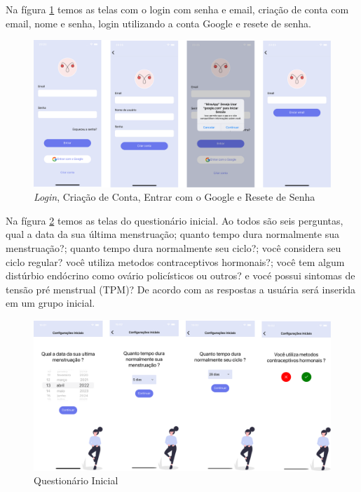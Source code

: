 Na fígura \ref{fig19} temos as telas com o login com senha e email, criação de conta com email, nome e senha, 
login utilizando a conta Google e resete de senha.

\begin{figure}[ht]
    \centering
    \includegraphics[keepaspectratio=true,scale=0.08]{figuras/aplicativo1.png}
    \caption{\emph{Login}, Criação de Conta, Entrar com o Google e Resete de Senha }
        \label{fig19}
\end{figure}


Na fígura \ref{fig20} temos as telas do questionário inicial. Ao todos são seis perguntas, qual a data da sua 
última menstruação; quanto tempo dura normalmente sua menstruação?; quanto tempo dura normalmente seu ciclo?;
você considera seu ciclo regular? você utiliza metodos contraceptivos hormonais?; você tem algum distúrbio 
endócrino como ovário policísticos ou outros? e vocé possui sintomas de tensão pré menstrual (TPM)? 
De acordo com as respostas a usuária será inserida em um grupo inicial.

\begin{figure}[ht]
    \centering
    \includegraphics[keepaspectratio=true,scale=0.08]{figuras/aplicativo4.png}
    \caption{Questionário Inicial}
        \label{fig20}
\end{figure}

